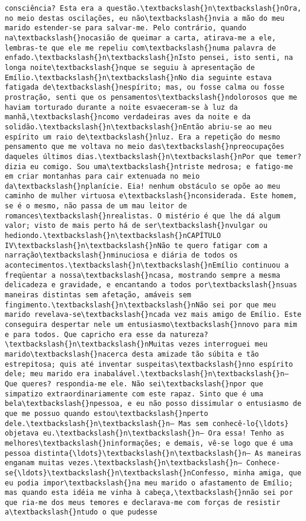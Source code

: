 \begin{Verbatim}[commandchars=\\\{\}]
consciência? Esta era a questão.\textbackslash{}n\textbackslash{}nOra, no meio destas oscilações, eu não\textbackslash{}nvia a mão do meu marido estender-se para salvar-me. Pelo contrário, quando na\textbackslash{}nocasião de queimar a carta, atirava-me a ele, lembras-te que ele me repeliu com\textbackslash{}numa palavra de enfado.\textbackslash{}n\textbackslash{}nIsto pensei, isto senti, na longa noite\textbackslash{}nque se seguiu à apresentação de Emílio.\textbackslash{}n\textbackslash{}nNo dia seguinte estava fatigada de\textbackslash{}nespírito; mas, ou fosse calma ou fosse prostração, senti que os pensamentos\textbackslash{}ndolorosos que me haviam torturado durante a noite esvaeceram-se à luz da manhã,\textbackslash{}ncomo verdadeiras aves da noite e da solidão.\textbackslash{}n\textbackslash{}nEntão abriu-se ao meu espírito um raio de\textbackslash{}nluz. Era a repetição do mesmo pensamento que me voltava no meio das\textbackslash{}npreocupações daqueles últimos dias.\textbackslash{}n\textbackslash{}nPor que temer? dizia eu comigo. Sou uma\textbackslash{}ntriste medrosa; e fatigo-me em criar montanhas para cair extenuada no meio da\textbackslash{}nplanície. Eia! nenhum obstáculo se opõe ao meu caminho de mulher virtuosa e\textbackslash{}nconsiderada. Este homem, se é o mesmo, não passa de um mau leitor de romances\textbackslash{}nrealistas. O mistério é que lhe dá algum valor; visto de mais perto há de ser\textbackslash{}nvulgar ou hediondo.\textbackslash{}n\textbackslash{}nCAPÍTULO IV\textbackslash{}n\textbackslash{}nNão te quero fatigar com a narração\textbackslash{}nminuciosa e diária de todos os acontecimentos.\textbackslash{}n\textbackslash{}nEmílio continuou a freqüentar a nossa\textbackslash{}ncasa, mostrando sempre a mesma delicadeza e gravidade, e encantando a todos por\textbackslash{}nsuas maneiras distintas sem afetação, amáveis sem fingimento.\textbackslash{}n\textbackslash{}nNão sei por que meu marido revelava-se\textbackslash{}ncada vez mais amigo de Emílio. Este conseguira despertar nele um entusiasmo\textbackslash{}nnovo para mim e para todos. Que capricho era esse da natureza?\textbackslash{}n\textbackslash{}nMuitas vezes interroguei meu marido\textbackslash{}nacerca desta amizade tão súbita e tão estrepitosa; quis até inventar suspeitas\textbackslash{}nno espírito dele; meu marido era inabalável.\textbackslash{}n\textbackslash{}n— Que queres? respondia-me ele. Não sei\textbackslash{}npor que simpatizo extraordinariamente com este rapaz. Sinto que é uma bela\textbackslash{}npessoa, e eu não posso dissimular o entusiasmo de que me possuo quando estou\textbackslash{}nperto dele.\textbackslash{}n\textbackslash{}n— Mas sem conhecê-lo{\ldots} objetava eu.\textbackslash{}n\textbackslash{}n— Ora essa! Tenho as melhores\textbackslash{}ninformações; e demais, vê-se logo que é uma pessoa distinta{\ldots}\textbackslash{}n\textbackslash{}n— As maneiras enganam muitas vezes.\textbackslash{}n\textbackslash{}n— Conhece-se{\ldots}\textbackslash{}n\textbackslash{}nConfesso, minha amiga, que eu podia impor\textbackslash{}na meu marido o afastamento de Emílio; mas quando esta idéia me vinha à cabeça,\textbackslash{}nnão sei por que ria-me dos meus temores e declarava-me com forças de resistir a\textbackslash{}ntudo o que pudesse 
\end{Verbatim}

